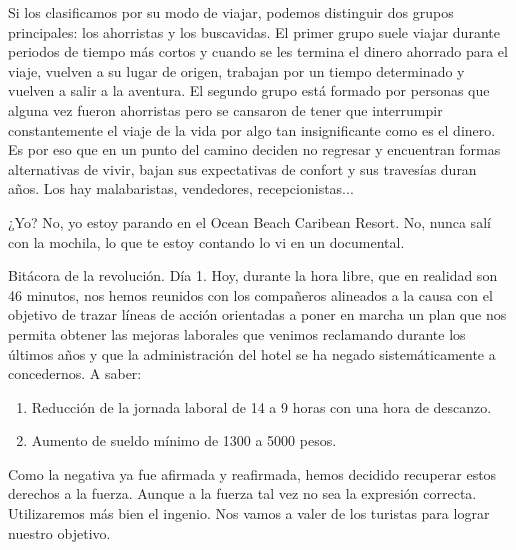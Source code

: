 \documentclass[12pt,twoside,openright,a5paper]{book}
\begin{document}
Si los clasificamos por su modo de viajar, podemos distinguir dos grupos
principales: los ahorristas y los buscavidas. El primer grupo suele viajar
durante periodos de tiempo más cortos y cuando se les termina el dinero
ahorrado para el viaje, vuelven a su lugar de origen, trabajan por un
tiempo determinado y vuelven a salir a la aventura. El segundo grupo está
formado por personas que alguna vez fueron ahorristas pero se cansaron
de tener que interrumpir constantemente el viaje de la vida por algo tan
insignificante como es el dinero. Es por eso que en un punto del camino
deciden no regresar y encuentran formas alternativas de vivir, bajan sus
expectativas de confort y sus travesías duran años. Los hay malabaristas,
vendedores, recepcionistas...

¿Yo? No, yo estoy parando en el Ocean Beach Caribean Resort. No, nunca
salí con la mochila, lo que te estoy contando lo vi en un documental.


\vspace{0.5cm}
\hrulefill\hspace{0.2cm} \decofourleft\decofourright \hspace{0.2cm} \hrulefill
\vspace{0.5cm}

Bitácora de la revolución. Día 1. Hoy, durante la hora libre, que en
realidad son 46 minutos, nos hemos reunidos con los compañeros alineados
a la causa con el objetivo de trazar líneas de acción orientadas a poner
en marcha un plan que nos permita obtener las mejoras laborales que venimos
reclamando durante los últimos años y que la administración del hotel
se ha negado sistemáticamente a concedernos. A saber:

\begin{enumerate}
\item Reducción de la jornada laboral de 14 a 9 horas con una hora de descanzo.
\item Aumento de sueldo mínimo de 1300 a 5000 pesos.
\end{enumerate}

Como la negativa ya fue afirmada y reafirmada, hemos decidido recuperar
estos derechos a la fuerza. Aunque a la fuerza tal vez no sea la expresión
correcta. Utilizaremos más bien el ingenio. Nos vamos a valer de los turistas
para lograr nuestro objetivo.


\vspace{0.5cm}
\hrulefill\hspace{0.2cm} \decofourleft\decofourright \hspace{0.2cm} \hrulefill
\vspace{0.5cm}
\end{document}
